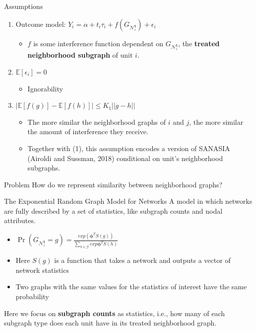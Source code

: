 \documentclass[newPxFont,numfooter,sectionpages]{beamer}
\newcommand{\E}{\mathbb{E}}
\newcommand{\bt}{\mathbf{t}}
\newcommand{\Gni}{G_{\mathcal{N}_i^\bt}}
\newcommand{\btheta}{\boldsymbol{\phi}}
\begin{document}
\begin{frame}{Assumptions}
\begin{enumerate}
  \item Outcome model: $Y_i = \alpha + t_i\tau_i + f(\Gni) + \epsilon_i$
  \begin{itemize}
    \item $f$ is some interference function dependent on $\Gni$, the \textbf{treated neighborhood subgraph} of unit $i$.
  \end{itemize}
  \item $\E[\epsilon_i] = 0$
    \begin{itemize}
    \item Ignorability
  \end{itemize}
  \item $|\E[f(g)] - \E[f(h)]| \leq K_1||g - h||$
  \begin{itemize}
    \item The more similar the neighborhood graphs of $i$ and $j$, the more similar the amount of interference they receive.
    \item Together with (1), this assumption encodes a version of SANASIA (Airoldi and Sussman, 2018) conditional on unit's neighborhood subgraphs.
  \end{itemize}
\end{enumerate}
\begin{alertblock}{Problem}
How do we represent similarity between neighborhood graphs?
\end{alertblock}
\end{frame}
\begin{frame}{The Exponential Random Graph Model for Networks}
A model in which networks are fully described by a set of statistics, like subgraph counts and nodal attributes. 
\begin{itemize}
  \item $\Pr(\Gni = g) = \frac{exp(\btheta^TS(g))}{\sum_{h \in \mathcal{G}} exp{\btheta^TS(h)}}$
  \item Here $S(g)$ is a function that takes a network and outputs a vector of network statistics
  \item Two graphs with the same values for the statistics of interest have the same probability
\end{itemize}
Here we focus on \textbf{subgraph counts} as statistics, i.e., how many of each subgraph type does each unit have in its treated neighborhood graph.
\end{frame}
\end{document}
